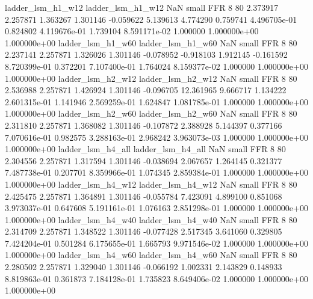        ladder_lsm_h1_w12        ladder_lsm_h1_w12                   NaN      small      FFR                 8 80 2.373917       2.257871 1.363267       1.301146   -0.059622      5.139613      4.774290     0.759741   4.496705e-01  0.824802 4.119676e-01     1.739104   8.591171e-02            1.000000    1.000000e+00        1.000000e+00
       ladder_lsm_h1_w60        ladder_lsm_h1_w60                   NaN      small      FFR                 8 80 2.237141       2.257871 1.326026       1.301146   -0.078952     -0.918103      1.912145    -0.161592   8.720399e-01  0.372201 7.107400e-01     1.764024   8.159377e-02            1.000000    1.000000e+00        1.000000e+00
       ladder_lsm_h2_w12        ladder_lsm_h2_w12                   NaN      small      FFR                 8 80 2.536988       2.257871 1.426924       1.301146   -0.096705     12.361965      9.666717     1.134222   2.601315e-01  1.141946 2.569259e-01     1.624847   1.081785e-01            1.000000    1.000000e+00        1.000000e+00
       ladder_lsm_h2_w60        ladder_lsm_h2_w60                   NaN      small      FFR                 8 80 2.311810       2.257871 1.368082       1.301146   -0.107872      2.388928      5.144397     0.377166   7.070616e-01  0.982575 3.288163e-01     2.968242   3.963073e-03            1.000000    1.000000e+00        1.000000e+00
       ladder_lsm_h4_all        ladder_lsm_h4_all                   NaN      small      FFR                 8 80 2.304556       2.257871 1.317594       1.301146   -0.038694      2.067657      1.264145     0.321377   7.487738e-01  0.207701 8.359966e-01     1.074345   2.859384e-01            1.000000    1.000000e+00        1.000000e+00
       ladder_lsm_h4_w12        ladder_lsm_h4_w12                   NaN      small      FFR                 8 80 2.425475       2.257871 1.364891       1.301146   -0.055784      7.423091      4.899100     0.851068   3.973037e-01  0.647608 5.191161e-01     1.076163   2.851298e-01            1.000000    1.000000e+00        1.000000e+00
       ladder_lsm_h4_w40        ladder_lsm_h4_w40                   NaN      small      FFR                 8 80 2.314709       2.257871 1.348522       1.301146   -0.077428      2.517345      3.641060     0.329805   7.424204e-01  0.501284 6.175655e-01     1.665793   9.971546e-02            1.000000    1.000000e+00        1.000000e+00
       ladder_lsm_h4_w60        ladder_lsm_h4_w60                   NaN      small      FFR                 8 80 2.280502       2.257871 1.329040       1.301146   -0.066192      1.002331      2.143829     0.148933   8.819863e-01  0.361873 7.184128e-01     1.735823   8.649406e-02            1.000000    1.000000e+00        1.000000e+00
